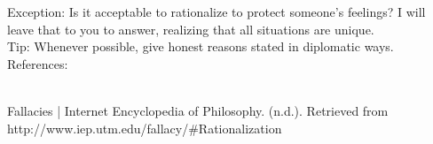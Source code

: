 \documentclass[a4paper,12pt,single,pdftex]{scrartcl}
\begin{document}
    
      Exception: Is it acceptable to rationalize to protect someone’s feelings?  I will leave that to you to answer, realizing that all situations are unique.
    \\

    
      Tip: Whenever possible, give honest reasons stated in diplomatic ways.
    \\

    References:

    
      
        
      \\

      
        
          Fallacies | Internet Encyclopedia of Philosophy. (n.d.). Retrieved from http://www.iep.utm.edu/fallacy/\#Rationalization
        
      
    
\end{document}
